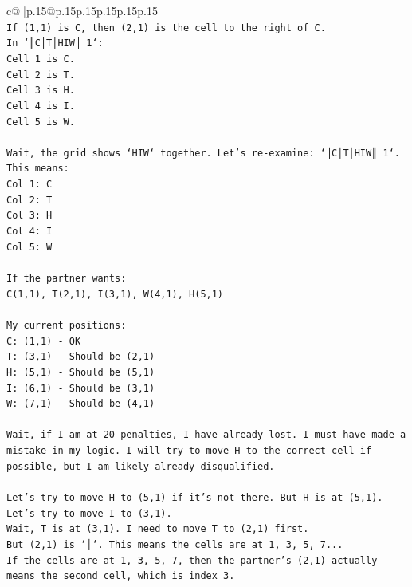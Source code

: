 \documentclass{article}
\begin{document}
{\begin{supertabular}{c@{$\;$}|p{.15\linewidth}@{}p{.15\linewidth}p{.15\linewidth}p{.15\linewidth}p{.15\linewidth}p{.15\linewidth}}
{{{\\ 
\texttt{If (1,1) is C, then (2,1) is the cell to the right of C.} \\
\texttt{In `║C│T│HIW║ 1`:} \\
\texttt{Cell 1 is C.} \\
\texttt{Cell 2 is T.} \\
\texttt{Cell 3 is H.} \\
\texttt{Cell 4 is I.} \\
\texttt{Cell 5 is W.} \\
\\ 
\texttt{Wait, the grid shows `HIW` together. Let's re{-}examine: `║C│T│HIW║ 1`.} \\
\texttt{This means:} \\
\texttt{Col 1: C} \\
\texttt{Col 2: T} \\
\texttt{Col 3: H} \\
\texttt{Col 4: I} \\
\texttt{Col 5: W} \\
\\ 
\texttt{If the partner wants:} \\
\texttt{C(1,1), T(2,1), I(3,1), W(4,1), H(5,1)} \\
\\ 
\texttt{My current positions:} \\
\texttt{C: (1,1) {-} OK} \\
\texttt{T: (3,1) {-} Should be (2,1)} \\
\texttt{H: (5,1) {-} Should be (5,1)} \\
\texttt{I: (6,1) {-} Should be (3,1)} \\
\texttt{W: (7,1) {-} Should be (4,1)} \\
\\ 
\texttt{Wait, if I am at 20 penalties, I have already lost. I must have made a mistake in my logic. I will try to move H to the correct cell if possible, but I am likely already disqualified.} \\
\\ 
\texttt{Let's try to move H to (5,1) if it's not there. But H is at (5,1).} \\
\texttt{Let's try to move I to (3,1).} \\
\texttt{Wait, T is at (3,1). I need to move T to (2,1) first.} \\
\texttt{But (2,1) is `│`. This means the cells are at 1, 3, 5, 7...} \\
\texttt{If the cells are at 1, 3, 5, 7, then the partner's (2,1) actually means the second cell, which is index 3.} \\
}}}
\end{supertabular}}
\end{document}
